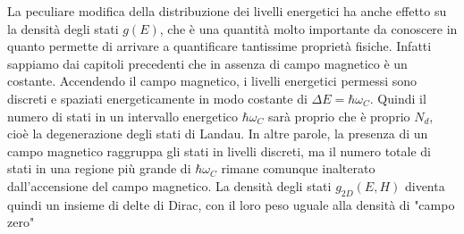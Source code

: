 La peculiare modifica della distribuzione dei livelli energetici ha anche effetto su la densit\`a degli stati $g(E)$, che \`e una quantit\`a molto importante da conoscere in quanto permette di arrivare a quantificare tantissime propriet\`a fisiche. Infatti sappiamo dai capitoli precedenti che 
in assenza di campo magnetico \`e un costante. Accendendo il campo magnetico, i livelli energetici permessi sono discreti e spaziati energeticamente in modo costante di $\Delta E = \hbar \omega_C$. Quindi il numero di stati in un intervallo energetico $\hbar\omega_C$ sar\`a proprio
che \`e proprio $N_d$, cio\`e la degenerazione degli stati di Landau. In altre parole, la presenza di un campo magnetico raggruppa gli stati in livelli discreti, ma il numero totale di stati in una regione pi\`u grande di $\hbar\omega_C$ rimane comunque inalterato dall'accensione del campo magnetico. La densit\`a degli stati $g_{2D}(E,H)$ diventa quindi un insieme di delte di Dirac, con il loro peso uguale alla densit\`a di "campo zero"









